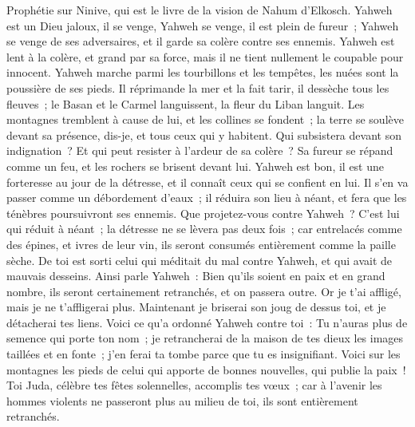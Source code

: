 \begin{multicols}{2}
\VerseOne{}Prophétie sur Ninive, qui est le livre de la vision de Nahum d'Elkosch.
Yahweh est un Dieu jaloux, il se venge, Yahweh se venge, il est plein de fureur~; Yahweh se venge de ses adversaires, et il garde sa colère contre ses ennemis.
Yahweh est lent à la colère, et grand par sa force, mais il ne tient nullement le coupable pour innocent. Yahweh marche parmi les tourbillons et les tempêtes, les nuées sont la poussière de ses pieds.
Il réprimande la mer et la fait tarir, il dessèche tous les fleuves~; le Basan et le Carmel languissent, la fleur du Liban languit.
Les montagnes tremblent à cause de lui, et les collines se fondent~; la terre se soulève devant sa présence, dis-je, et tous ceux qui y habitent.
Qui subsistera devant son indignation~? Et qui peut resister à l'ardeur de sa colère~? Sa fureur se répand comme un feu, et les rochers se brisent devant lui.
Yahweh est bon, il est une forteresse au jour de la détresse, et il connaît ceux qui se confient en lui.
Il s'en va passer comme un débordement d'eaux~; il réduira son lieu à néant, et fera que les ténèbres poursuivront ses ennemis.
Que projetez-vous contre Yahweh~? C'est lui qui réduit à néant~; la détresse ne se lèvera pas deux fois~;
car entrelacés comme des épines, et ivres de leur vin, ils seront consumés entièrement comme la paille sèche.
De toi est sorti celui qui méditait du mal contre Yahweh, et qui avait de mauvais desseins.
Ainsi parle Yahweh~: Bien qu'ils soient en paix et en grand nombre, ils seront certainement retranchés, et on passera outre. Or je t'ai affligé, mais je ne t'affligerai plus.
Maintenant je briserai son joug de dessus toi, et je détacherai tes liens.
Voici ce qu'a ordonné Yahweh contre toi~: Tu n'auras plus de semence qui porte ton nom~; je retrancherai de la maison de tes dieux les images taillées et en fonte~; j'en ferai ta tombe parce que tu es insignifiant.
\VerseOne{}Voici sur les montagnes les pieds de celui qui apporte de bonnes nouvelles, qui publie la paix~! Toi Juda, célèbre tes fêtes solennelles, accomplis tes vœux~; car à l'avenir les hommes violents ne passeront plus au milieu de toi, ils sont entièrement retranchés.

\end{multicols}
